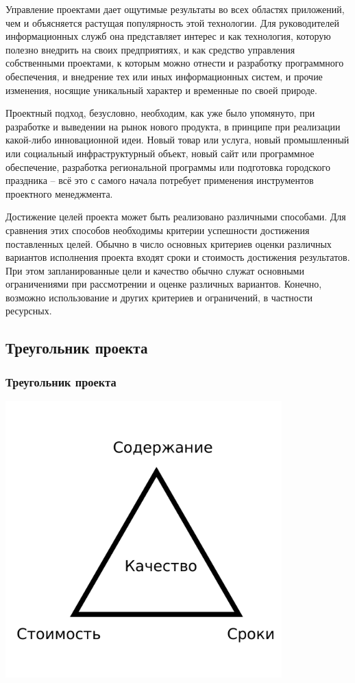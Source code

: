 \documentclass{../industrial-development}
\begin{document}
Управление проектами дает ощутимые результаты во всех областях приложений, чем и объясняется растущая популярность этой технологии. Для руководителей информационных служб она представляет интерес и как технология, которую полезно внедрить на своих предприятиях, и как средство управления собственными проектами, к которым можно отнести и разработку программного обеспечения, и внедрение тех или иных информационных систем, и прочие изменения, носящие уникальный характер и временные по своей природе.

Проектный подход, безусловно, необходим, как уже было упомянуто, при разработке и выведении на рынок нового продукта, в принципе при реализации какой-либо инновационной идеи. Новый товар или услуга, новый промышленный или социальный инфраструктурный объект, новый сайт или программное обеспечение, разработка региональной программы или подготовка городского праздника – всё это с самого начала потребует применения инструментов проектного менеджмента.
    
Достижение целей проекта может быть реализовано различными способами. Для сравнения этих способов необходимы критерии успешности достижения поставленных целей. Обычно в число основных критериев оценки различных вариантов исполнения проекта входят сроки и стоимость достижения результатов. При этом запланированные цели и качество обычно служат основными ограничениями при рассмотрении и оценке различных вариантов. Конечно, возможно использование и других критериев и ограничений, в частности ресурсных.

    \subsection{Треугольник проекта}

    \begin{frame} \frametitle{Треугольник проекта}
         \centerline{\includegraphics[width=0.8\textwidth]{triangle.pdf}}
    \end{frame}
    \lecturenotes
\end{document}
